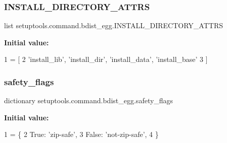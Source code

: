 \subsubsection{\texorpdfstring{I\+N\+S\+T\+A\+L\+L\+\_\+\+D\+I\+R\+E\+C\+T\+O\+R\+Y\+\_\+\+A\+T\+T\+RS}{INSTALL\_DIRECTORY\_ATTRS}}
{\footnotesize\ttfamily list setuptools.\+command.\+bdist\+\_\+egg.\+I\+N\+S\+T\+A\+L\+L\+\_\+\+D\+I\+R\+E\+C\+T\+O\+R\+Y\+\_\+\+A\+T\+T\+RS}

{\bfseries Initial value\+:}
\begin{DoxyCode}
1 =  [
2     \textcolor{stringliteral}{'install\_lib'}, \textcolor{stringliteral}{'install\_dir'}, \textcolor{stringliteral}{'install\_data'}, \textcolor{stringliteral}{'install\_base'}
3 ]
\end{DoxyCode}
\mbox{\label{namespacesetuptools_1_1command_1_1bdist__egg_a13246e82c91f270961f661c12585d4f4}} 
\subsubsection{\texorpdfstring{safety\+\_\+flags}{safety\_flags}}
{\footnotesize\ttfamily dictionary setuptools.\+command.\+bdist\+\_\+egg.\+safety\+\_\+flags}

{\bfseries Initial value\+:}
\begin{DoxyCode}
1 =  \{
2     \textcolor{keyword}{True}: \textcolor{stringliteral}{'zip-safe'},
3     \textcolor{keyword}{False}: \textcolor{stringliteral}{'not-zip-safe'},
4 \}
\end{DoxyCode}
